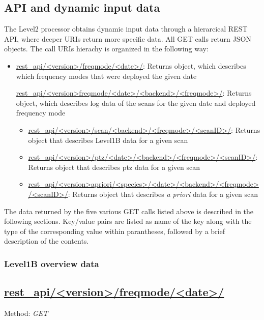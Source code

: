 \clearpage
\newpage
\subsection{API and dynamic input data}
\label{sec:api}

The Level2 processor obtains dynamic input data through
a hierarcical REST API, where deeper URIs return more
specific data. All GET calls return JSON objects.
The call URIs hierachy is organized in the following way:
\begin{itemize}
    \item \url{rest_api/<version>/freqmode/<date>/}: Returns object, which describes which frequency modes that were deployed the
    given date
    \begin{itemize}
        \url{rest_api/<version>freqmode/<date>/<backend>/<freqmode>/}: Returns object, which describes log data of the scans
        for the given date and deployed frequency mode
        \begin{itemize}
           \item \url{rest_api/<version>/scan/<backend>/<freqmode>/<scanID>/}: Returns object that describes Level1B data for a given scan       
           \item \url{rest_api/<version>/ptz/<date>/<backend>/<freqmode>/<scanID>/}: Returns object that describes ptz data for a given scan
           \item \url{rest_api/<version>apriori/<species>/<date>/<backend>/<freqmode>/<scanID>/}: Returns object that describes \textit{a priori} data for a given scan
        \end{itemize}  
    \end{itemize}
\end{itemize}
  
The data returned by the five various GET calls listed above 
is described in the following sections.
Key/value pairs are listed as name of the key
along with the type of the corresponding value within parantheses, followed
by a brief description of the contents.

\subsubsection{Level1B overview data}
\subsection*{\url{rest_api/<version>/freqmode/<date>/}}
Method: \emph{GET}

